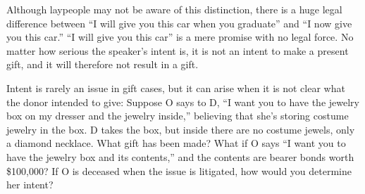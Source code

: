 Although laypeople may not be aware of this distinction, there is a huge legal
difference between ``I will give you this car when you graduate'' and ``I now
give you this car.''  ``I will give you this car'' is
a mere promise with no legal force.  No matter how serious the speaker's intent
is, it is not an intent to make a present gift, and it will therefore not
result in a gift.

Intent is rarely an issue in gift cases, but it can arise when it is not clear
what the donor intended to give: Suppose O says to D, ``I want you to have the
jewelry box on my dresser and the jewelry inside,'' believing that she's
storing costume jewelry in the box.  D takes the box, but inside there are no
costume jewels, only a diamond necklace.  What gift has been made?  What if O
says ``I want you to have the jewelry box and its contents,'' and the contents
are bearer bonds worth \$100,000?  If O is deceased when the issue is
litigated, how would you determine her intent?

